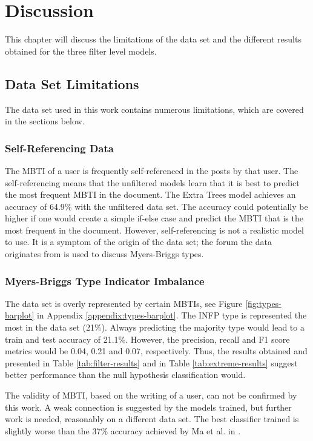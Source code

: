 \section{Discussion} \label{sec:discussion}

This chapter will discuss the limitations of the data set and the different results obtained for the three filter level models. 

\subsection{Data Set Limitations}

The data set used in this work contains numerous limitations, which are covered in the sections below.

\subsubsection{Self-Referencing Data}
The MBTI of a user is frequently self-referenced in the posts by that user. 
The self-referencing means that the unfiltered models learn that it is best to predict the most frequent MBTI in the document.
The Extra Trees model achieves an accuracy of 64.9\% with the unfiltered data set.
The accuracy could potentially be higher if one would create a simple if-else case and predict the MBTI that is the most frequent in the document.
However, self-referencing is not a realistic model to use.
It is a symptom of the origin of the data set; the forum the data originates from is used to discuss Myers-Briggs types.

\subsubsection{Myers-Briggs Type Indicator Imbalance}
The data set is overly represented by certain MBTIs, see Figure \ref{fig:types-barplot} in Appendix \ref{appendix:types-barplot}.
The INFP type is represented the most in the data set (21\%).
Always predicting the majority type would lead to a train and test accuracy of 21.1\%.
However, the precision, recall and F1 score metrics would be 0.04, 0.21 and 0.07, respectively.
Thus, the results obtained and presented in Table \ref{tab:filter-results} and in Table \ref{tab:extreme-results} suggest better performance than the null hypothesis classification would.

The validity of MBTI, based on the writing of a user, can not be confirmed by this work.
A weak connection is suggested by the models trained, but further work is needed, reasonably on a different data set.
The best classifier trained is slightly worse than the 37\% accuracy achieved by Ma et al. in \cite{maneural}.

